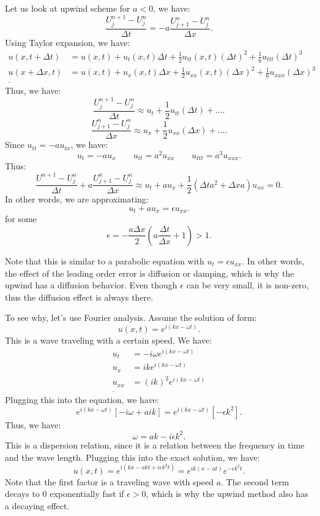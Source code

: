 \documentclass[../main/main.tex]{subfiles}
\begin{document}
Let us look at upwind scheme for $a<0$, we have: \[
 \frac{U_j^{n+1}-U^n_j}{\Delta t} = -a \frac{U_{j+1}^n-U^n_j}{\Delta x}
.\] Using Taylor expansion, we have: 
\begin{align*}
    u(x, t+ \Delta t) &= u(x,t) + u_t(x,t) \Delta t + \frac{1}{2}u_{t t}(x,t) (\Delta t)^2 + \frac{1}{6} u_{t t t}(\Delta t)^{3} \\
    u(x + \Delta x, t) &= u(x,t) + u_x(x,t) \Delta x + \frac{1}{2}u_{x x}(x,t) (\Delta x)^2 + \frac{1}{6} u_{x x x}(\Delta x)^{3} \\
.\end{align*}
Thus, we have: \[
    \frac{U_{j}^{n+1}-U^n_j}{\Delta t}\approx u_t + \frac{1}{2}u_{ t t} (\Delta t) + \ldots
.\] \[ 
    \frac{U_{j+1}^{n}-U^n_j}{\Delta x}\approx u_x + \frac{1}{2}u_{ x x} (\Delta x) + \ldots
.\] Since $u_{t t} = -a u_{tx}$, we have: \[
u_t = -au_x \quad \quad u_{t t }= a^2 u_{ x x} \quad \quad u_{ t t t} = a^3 u_{x x x} 
.\] 
Thus: \[
    \frac{U^{n+1}- U^n_j}{\Delta t} + a \frac{U_{j+1}^n - U^n_j}{\Delta x} \approx u_t + a u_x + \frac{1}{2}\left( \Delta t a^2 + \Delta x a \right) u_{x x} = 0
.\]
In other words, we are approximating: \[
u_t + a u_x = \epsilon u_{x x} 
.\] for some \[
\epsilon = - \frac{a \Delta x}{2}\left( a \frac{\Delta t}{\Delta x}+1 \right) >1
.\] 
\begin{remark} 
    Note that this is similar to a parabolic equation with $u_t = \epsilon u_{ x x}$. In other words, the effect of the leading order error is diffusion or damping, which is why the upwind has a diffusion behavior. Even though $\epsilon$ can be very small, it is non-zero, thus the diffusion effect is always there.
\end{remark} 
To see why, let's use Fourier analysis. Assume the solution of form: \[
u(x,t) = e^{i(kx-\omega t)}
.\] This is a wave traveling with a  certain speed. We have: 
\begin{align*} 
    u_t &= -i\omega e^{i(kx-\omega t)}\\
    u_x &= ik e^{i(kx-\omega t)} \\
    u_{x x} &= (ik)^2 e^{i(kx-\omega t)} \\
.\end{align*}
Plugging this into the equation, we have: \[
    e^{i(kx-\omega t)}\left[ -i\omega + aik \right] = e^{i(kx - \omega t)}[-\epsilon k^2]
.\] 
Thus, we have: \[
\omega = ak - i\epsilon k^2
.\] This is a dispersion relation, since it is a relation between the frequency in time and the wave length. Plugging this into the exact solution, we have: \[
u(x,t) = e^{i(kx-akt+i\epsilon k^2t)} = e^{ik(x-at)}e^{-\epsilon k^2 t}
.\]Note that the first factor is a traveling wave with speed $a$. The second term decays to 0 exponentially fast if $\epsilon >0$, which is why the upwind method also has a decaying effect.
\end{document}
